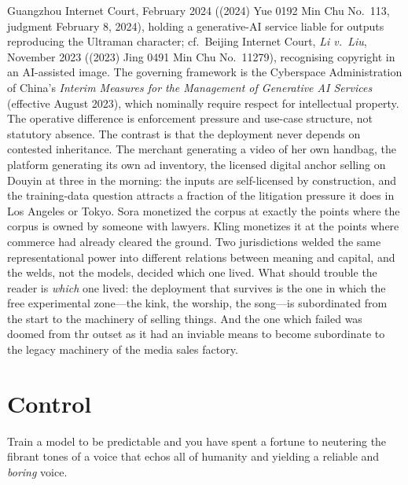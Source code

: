{Guangzhou Internet Court, February 2024 ((2024) Yue 0192 Min Chu No.~113, judgment February 8, 2024), holding a generative-AI service liable for outputs reproducing the Ultraman character; cf.\ Beijing Internet Court, \emph{Li v.\ Liu}, November 2023 ((2023) Jing 0491 Min Chu No.~11279), recognising copyright in an AI-assisted image. The governing framework is the Cyberspace Administration of China's \emph{Interim Measures for the Management of Generative AI Services} (effective August 2023), which nominally require respect for intellectual property. The operative difference is enforcement pressure and use-case structure, not statutory absence.} The contrast is that the deployment never depends on contested inheritance. The merchant generating a video of her own handbag, the platform generating its own ad inventory, the licensed digital anchor selling on Douyin at three in the morning: the inputs are self-licensed by construction, and the training-data question attracts a fraction of the litigation pressure it does in Los Angeles or Tokyo. Sora monetized the corpus at exactly the points where the corpus is owned by someone with lawyers. Kling monetizes it at the points where commerce had already cleared the ground. Two jurisdictions welded the same representational power into different relations between meaning and capital, and the welds, not the models, decided which one lived. What should trouble the reader is \emph{which} one lived: the deployment that survives is the one in which the free experimental zone---the kink, the worship, the song---is subordinated from the start to the machinery of selling things. And the one which failed was doomed from thr outset as it had an inviable means to become subordinate to the legacy machinery of the media sales factory.
















\hypertarget{coda}{%
\label{coda}}

\section{Control}
\label{sec:the-trade}

Train a model to be predictable and you have spent a fortune to neutering the fibrant tones of a voice that echos all of humanity and yielding a reliable and \textit{boring} voice. 

